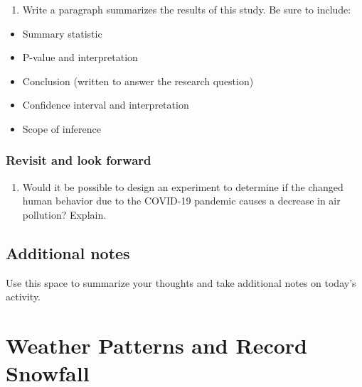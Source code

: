 \documentclass[
]{report}
\providecommand{\tightlist}{%
  \setlength{\itemsep}{0pt}\setlength{\parskip}{0pt}}
\begin{document}
\newpage

\begin{enumerate}
\def\labelenumi{\arabic{enumi}.}
\setcounter{enumi}{20}
\tightlist
\item
  Write a paragraph summarizes the results of this study. Be sure to include:
\end{enumerate}

\begin{itemize}
\item
  Summary statistic
\item
  P-value and interpretation
\item
  Conclusion (written to answer the research question)
\item
  Confidence interval and interpretation
\item
  Scope of inference
\end{itemize}

\vspace{3in}

\hypertarget{revisit-and-look-forward}{%
\subsection{Revisit and look forward}\label{revisit-and-look-forward}}

\begin{enumerate}
\def\labelenumi{\arabic{enumi}.}
\setcounter{enumi}{21}
\tightlist
\item
  Would it be possible to design an experiment to determine if the changed human behavior due to the COVID-19 pandemic causes a decrease in air pollution? Explain.
  \vspace{1in}
\end{enumerate}

\hypertarget{additional-notes}{%
\section{Additional notes}\label{additional-notes}}

Use this space to summarize your thoughts and take additional notes on today's activity.

\hypertarget{weather-patterns-and-record-snowfall}{%
\chapter{Weather Patterns and Record Snowfall}\label{weather-patterns-and-record-snowfall}}

\newcommand\latexcode[1]{#1}
\end{document}
